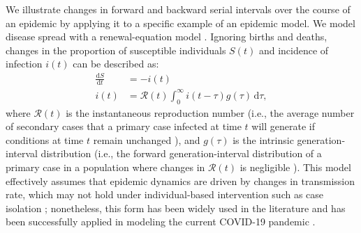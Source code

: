 \documentclass[12pt]{article}
\newcommand{\RR}{\ensuremath{{\mathcal R}}\xspace}
\newcommand{\dd}[1]{\ensuremath{\, \mathrm{d}#1}}
\newcommand{\dtau}{\dd{\tau}}
\newcommand{\gdist}{g} %
\begin{document}
We illustrate changes in forward and backward serial intervals over the course of an epidemic by applying it to a specific example of an epidemic model.
We model disease spread with a renewal-equation model \citep{heesterbeek1996concept, diekmann2000mathematical, roberts2004modelling, aldis2005integral, roberts2007model, champredon2018equivalence}.
Ignoring births and deaths, changes in the proportion of susceptible individuals $S(t)$ and incidence of infection $i(t)$ can be described as:
\begin{align}
\frac{\mathrm{d}S}{\mathrm{d}t} &= - i(t)\nonumber\\
i(t) &= \RR(t) \int_0^\infty i(t-\tau) \gdist(\tau) \dtau,
\label{eq:renewal}
\end{align}
where $\RR(t)$ is the instantaneous reproduction number (i.e., the average number of secondary cases that a primary case infected at time $t$ will generate if conditions at time $t$ remain unchanged \citep{fraser2007estimating}), and $\gdist(\tau)$ is the intrinsic generation-interval distribution (i.e., the forward generation-interval distribution of a primary case in a population where changes in $\RR(t)$ is negligible \citep{champredon2015intrinsic}).
This model effectively assumes that epidemic dynamics are driven by changes in transmission rate, which may not hold under individual-based intervention such as case isolation \citep{fraser2007estimating};
nonetheless, this form has been widely used in the literature and has been successfully applied in modeling the current COVID-19 pandemic \citep{gostic2020practical}.
\end{document}

